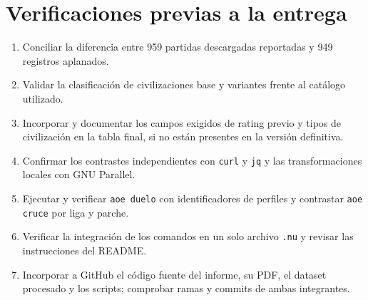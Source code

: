 \documentclass[12pt,a4paper]{article}
\begin{document}
\section{Verificaciones previas a la entrega}

\begin{enumerate}[leftmargin=1.0cm]
\item Conciliar la diferencia entre 959 partidas descargadas reportadas y 949 registros aplanados.
\item Validar la clasificación de civilizaciones base y variantes frente al catálogo utilizado.
\item Incorporar y documentar los campos exigidos de rating previo y tipos de civilización en la tabla final, si no están presentes en la versión definitiva.
\item Confirmar los contrastes independientes con \texttt{curl} y \texttt{jq} y las transformaciones locales con GNU Parallel.
\item Ejecutar y verificar \texttt{aoe duelo} con identificadores de perfiles y contrastar \texttt{aoe cruce} por liga y parche.
\item Verificar la integración de los comandos en un solo archivo \texttt{.nu} y revisar las instrucciones del README.
\item Incorporar a GitHub el código fuente del informe, su PDF, el dataset procesado y los scripts; comprobar ramas y commits de ambas integrantes.
\end{enumerate}
\end{document}
